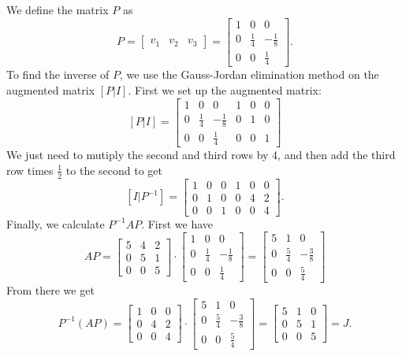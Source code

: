 \documentclass{article}
\begin{document}
\begin{solution}
  We define the matrix $P$ as
  \[P = \begin{bmatrix} v_1 & v_2 & v_3 \end{bmatrix} = \begin{bmatrix} 1 & 0 & 0\\ 0 & \frac{1}{4} & - \frac{1}{8}\\ 0 & 0 & \frac{1}{4} \end{bmatrix}.\]
  To find the inverse of $P$, we use the Gauss-Jordan elimination method on the augmented matrix $[P  |  I]$.
  First we set up the augmented matrix:
  \[[P  |  I] = \left[\begin{array}{ccc|ccc} 1 & 0 & 0 & 1 & 0 & 0 \\ 0 & \frac{1}{4} & -\frac{1}{8} & 0 & 1 & 0 \\ 0 & 0 & \frac{1}{4} & 0 & 0 & 1 \end{array} \right]\]
  We just need to mutiply the second and third rows by 4, and then add the third row times $\frac{1}{2}$ to the second to get
  \[[I | P^{-1}] = \left[\begin{array}{ccc|ccc} 1 & 0 & 0 & 1 & 0 & 0 \\ 0 & 1 & 0 & 0 & 4 & 2 \\ 0 & 0 & 1 & 0 & 0 & 4 \end{array} \right].\]
  Finally, we calculate $P^{-1} A P$.
  First we have
  \[A P = \begin{bmatrix} 5 & 4 & 2\\ 0 & 5 & 1\\ 0 & 0 & 5 \end{bmatrix} \cdot \begin{bmatrix} 1 & 0 & 0\\ 0 & \frac{1}{4} & - \frac{1}{8}\\ 0 & 0 & \frac{1}{4} \end{bmatrix} = \begin{bmatrix} 5 & 1 & 0\\ 0 & \frac{5}{4} & - \frac{3}{8}\\ 0 & 0 & \frac{5}{4} \end{bmatrix}\]
  From there we get
  \[P^{-1} (A P) = \begin{bmatrix} 1 & 0 & 0\\ 0 & 4 & 2\\ 0 & 0 & 4 \end{bmatrix} \cdot \begin{bmatrix}  5 & 1 & 0\\ 0 & \frac{5}{4} & - \frac{3}{8}\\ 0 & 0 & \frac{5}{4} \end{bmatrix} = \begin{bmatrix} 5 & 1 & 0\\ 0 & 5 & 1\\ 0 & 0 & 5 \end{bmatrix} = J.\]
\end{solution}
\end{document}
